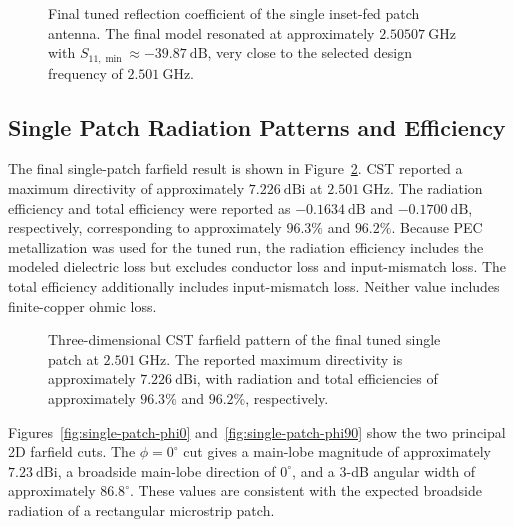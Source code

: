 \begin{figure}[H]
    \centering
    \caption{Final tuned reflection coefficient of the single inset-fed patch antenna.  The final model resonated at approximately \(2.50507~\mathrm{GHz}\) with \(S_{11,\min}\approx -39.87~\mathrm{dB}\), very close to the selected design frequency of \(2.501~\mathrm{GHz}\).}
    \label{fig:single-patch-s11-final}
\end{figure}

\subsection{Single Patch Radiation Patterns and Efficiency}

The final single-patch farfield result is shown in Figure~\ref{fig:single-patch-3d-farfield}.  CST
reported a maximum directivity of approximately \(7.226~\mathrm{dBi}\) at
\(2.501~\mathrm{GHz}\).  The radiation efficiency and total efficiency were reported as
\(-0.1634~\mathrm{dB}\) and \(-0.1700~\mathrm{dB}\), respectively, corresponding to approximately
\(96.3\%\) and \(96.2\%\).  Because PEC metallization was used for the tuned run, the radiation efficiency includes
the modeled dielectric loss but excludes conductor loss and input-mismatch loss. The total
efficiency additionally includes input-mismatch loss. Neither value includes finite-copper ohmic
loss.

\begin{figure}[H]
    \centering
    \caption{Three-dimensional CST farfield pattern of the final tuned single patch at \(2.501~\mathrm{GHz}\).  The reported maximum directivity is approximately \(7.226~\mathrm{dBi}\), with radiation and total efficiencies of approximately \(96.3\%\) and \(96.2\%\), respectively.}
    \label{fig:single-patch-3d-farfield}
\end{figure}

Figures~\ref{fig:single-patch-phi0} and~\ref{fig:single-patch-phi90} show the two principal 2D
farfield cuts.  The \(\phi=0^\circ\) cut gives a main-lobe magnitude of approximately
\(7.23~\mathrm{dBi}\), a broadside main-lobe direction of \(0^\circ\), and a 3-dB angular width of
approximately \(86.8^\circ\).  These values are consistent with the expected broadside radiation of a
rectangular microstrip patch.

